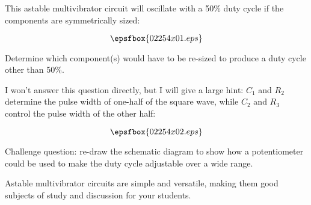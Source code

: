 

This astable multivibrator circuit will oscillate with a 50\% duty cycle if the components are symmetrically sized:

$$\epsfbox{02254x01.eps}$$

Determine which component(s) would have to be re-sized to produce a duty cycle other than 50\%.







I won't answer this question directly, but I will give a large hint: $C_1$ and $R_2$ determine the pulse width of one-half of the square wave, while $C_2$ and $R_3$ control the pulse width of the other half:

$$\epsfbox{02254x02.eps}$$

\vskip 10pt

Challenge question: re-draw the schematic diagram to show how a potentiometer could be used to make the duty cycle adjustable over a wide range.







Astable multivibrator circuits are simple and versatile, making them good subjects of study and discussion for your students.




